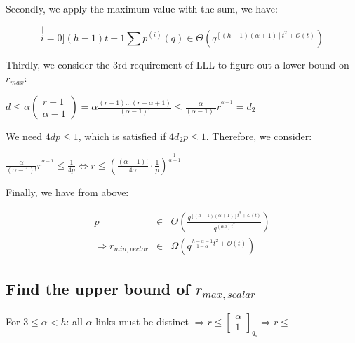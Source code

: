 Secondly, we apply the maximum value with the sum, we have:

\[
\stackrel[i=0]{(h-1)t-1}{\mathop{\sum}}p^{(i)}(q)\in\Theta\left(q^{\left[\left(h-1\right)\left(\alpha+1\right)\right]t^{2}+\mathcal{O}(t)}\right)
\]

Thirdly, we consider the 3rd requirement of LLL to figure out a lower
bound on $r_{max}$:

$d\leq\alpha\left(\begin{array}{c}
r-1\\
\alpha-1
\end{array}\right)=\alpha\frac{\left(r-1\right)\ldots\left(r-\alpha+1\right)}{\left(\alpha-1\right)!}\leq\frac{\alpha}{\left(\alpha-1\right)!}r^{^{\alpha-1}}=d_{2}$

We need $4dp\leq1$, which is satisfied if $4d_{2}p\leq1$. Therefore,
we consider:

$\frac{\alpha}{\left(\alpha-1\right)!}r^{^{\alpha-1}}\leq\frac{1}{4p}\Leftrightarrow r\leq\left(\frac{\left(\alpha-1\right)!}{4\alpha}\cdot\frac{1}{p}\right)^{\frac{1}{\alpha-1}}$

Finally, we have from above:

\begin{eqnarray*}
p & \in & \Theta\left(\frac{q^{\left[\left(h-1\right)\left(\alpha+1\right)\right]t^{2}+\mathcal{O}(t)}}{q^{\left(\alpha h\right)t^{2}}}\right)\\
\Rightarrow r_{min,vector} & \in & \Omega\left(q^{\frac{h-\alpha-1}{1-\alpha}t^{2}+\mathcal{O}(t)}\right)
\end{eqnarray*}


\subsection{Find the upper bound of $r_{max,scalar}$}

\noindent{}

For $3\leq\alpha<h$: all $\alpha$ links must be distinct $\Rightarrow r\leq\left[\begin{array}{c}
\alpha\\
1
\end{array}\right]_{q_{s}}\Rightarrow r\leq$

